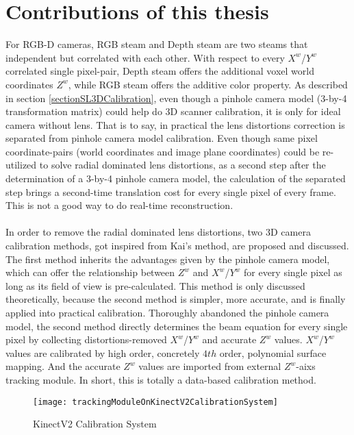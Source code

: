 \section{Contributions of this thesis}
For RGB-D cameras, RGB steam and Depth steam are two steams that independent but correlated with each other. With respect to every \(X^{w}\)/\(Y^{w}\) correlated single pixel-pair, Depth steam offers the additional voxel world coordinates \(Z^{w}\), while RGB steam offers the additive color property.
As described in section \ref{sectionSL3DCalibration}, even though a pinhole camera model (3-by-4 transformation matrix) could help do 3D scanner calibration, it is only for ideal camera without lens. That is to say, in practical the lens distortions correction is separated from pinhole camera model calibration. Even though same pixel coordinate-pairs (world coordinates and image plane coordinates) could be re-utilized to solve radial dominated lens distortions, as a second step after the determination of a 3-by-4 pinhole camera model, the calculation of the separated step brings a second-time translation cost for every single pixel of every frame. This is not a good way to do real-time reconstruction. %
\\\\%
In order to remove the radial dominated lens distortions, two 3D camera calibration methods, got inspired from Kai's method, are proposed and discussed. The first method inherits the advantages given by the pinhole camera model, which can offer the relationship between \(Z^{w}\) and \(X^{w}\)/\(Y^{w}\) for every single pixel as long as its field of view is pre-calculated. This method is only discussed theoretically, because the second method is simpler, more accurate, and is finally applied into practical calibration.%
Thoroughly abandoned the pinhole camera model, the second method directly determines the beam equation for every single pixel by collecting distortions-removed \(X^{w}\)/\(Y^{w}\) and accurate \(Z^{w}\) values. \(X^{w}\)/\(Y^{w}\) values are calibrated by high order, concretely \(4th\) order, polynomial surface mapping. And the accurate \(Z^{w}\) values are imported from external \(Z^{w}\)-aixs tracking module. In short, this is totally a data-based calibration method.%
%
\begin{figure}[H]
\centering
\texttt{[image: trackingModuleOnKinectV2CalibrationSystem]}
\caption{KinectV2 Calibration System}
\label{trackingModuleOnKinectV2CalibrationSystem}
\end{figure}%
